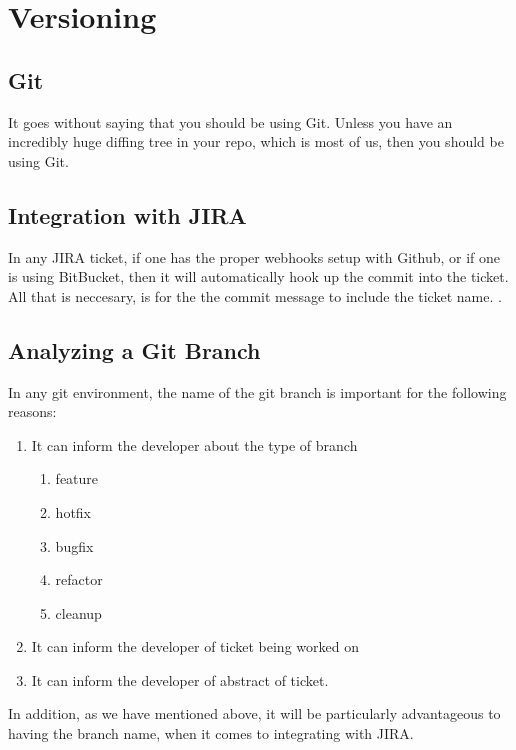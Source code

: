 \maketitle{}
\section{ Versioning }

\subsection { Git }
It goes without saying that you should be using Git. Unless you have an
incredibly huge diffing tree in your repo, which is most of us, then you should
be using Git.

\subsection { Integration with JIRA }
In any JIRA ticket, if one has the proper webhooks setup with Github, or if one
is using BitBucket, then it will automatically hook up the commit into the
ticket. All that is neccesary, is for the the commit message to include the
ticket name. .

\subsection { Analyzing a Git Branch }
In any git environment, the name of the git branch is important for the
following reasons:

\begin{enumerate}
  \item It can inform the developer about the type of branch
    \begin{enumerate}
      \item feature
      \item hotfix
      \item bugfix
      \item refactor
      \item cleanup
    \end{enumerate}
  \item It can inform the developer of ticket being worked on
  \item It can inform the developer of abstract of ticket.
\end{enumerate}

In addition, as we have mentioned above, it will be particularly advantageous to
having the branch name, when it comes to integrating with JIRA.

